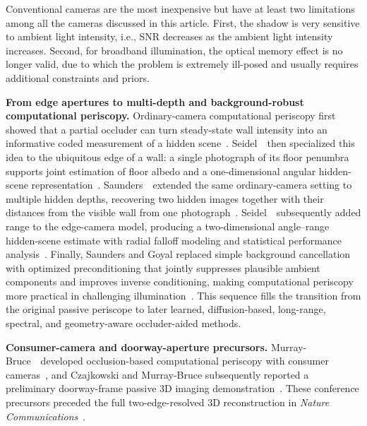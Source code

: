 Conventional cameras are the most inexpensive but have at least two limitations among all the cameras discussed in this article. First, the shadow is very sensitive to ambient light intensity, i.e., SNR decreases as the ambient light intensity increases. Second, for broadband illumination, the optical memory effect is no longer valid, due to which the problem is extremely ill-posed and usually requires additional constraints and priors.


\vspace{0.8mm}
\noindent \textbf{From edge apertures to multi-depth and background-robust computational periscopy.}
Ordinary-camera computational periscopy first showed that a partial occluder can turn steady-state wall intensity into an informative coded measurement of a hidden scene~\cite{saundersComputationalPeriscopyOrdinary2019}. Seidel~\etal~then specialized this idea to the ubiquitous edge of a wall: a single photograph of its floor penumbra supports joint estimation of floor albedo and a one-dimensional angular hidden-scene representation~\cite{DBLP:conf/iccp/SeidelMMSFYG19}. Saunders~\etal~extended the same ordinary-camera setting to multiple hidden depths, recovering two hidden images together with their distances from the visible wall from one photograph~\cite{saundersMultiDepthPeriscopy2020}. Seidel~\etal~subsequently added range to the edge-camera model, producing a two-dimensional angle--range hidden-scene estimate with radial falloff modeling and statistical performance analysis~\cite{seidelTwoDimensionalNonLineofSightScene2020}. Finally, Saunders and Goyal replaced simple background cancellation with optimized preconditioning that jointly suppresses plausible ambient components and improves inverse conditioning, making computational periscopy more practical in challenging illumination~\cite{saundersFastPeriscopy2021}. This sequence fills the transition from the original passive periscope to later learned, diffusion-based, long-range, spectral, and geometry-aware occluder-aided methods.

\vspace{0.8mm}
\noindent \textbf{Consumer-camera and doorway-aperture precursors.}
Murray-Bruce~\etal~developed occlusion-based computational periscopy with consumer cameras~\cite{murraybruceOcclusionConsumerCameras2019}, and Czajkowski and Murray-Bruce subsequently reported a preliminary doorway-frame passive 3D imaging demonstration~\cite{czajkowskiDoorFrames3DNLOS2022}. These conference precursors preceded the full two-edge-resolved 3D reconstruction in \textit{Nature Communications}~\cite{czajkowskiTwoEdgeResolved3DNLOS2024}.

